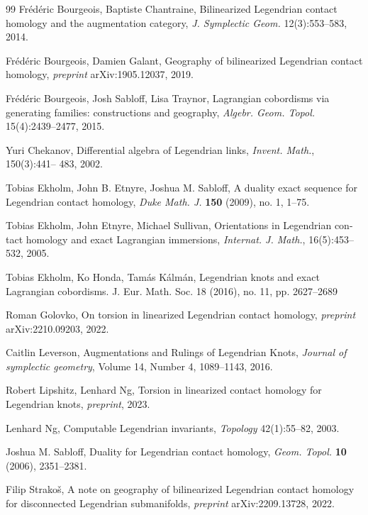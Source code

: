 \documentclass[11pt]{amsart}
\theoremstyle{plain}
\theoremstyle{remark}
\numberwithin{equation}{section}
\begin{document}
\begin{thebibliography}{99}
 Fr\'ed\'eric Bourgeois, Baptiste Chantraine, Bilinearized Legendrian contact homology and the augmentation category, 
{\em J. Symplectic Geom.} 12(3):553--583, 2014.

 Fr\'ed\'eric Bourgeois, Damien Galant, Geography of bilinearized Legendrian contact homology,
{\em preprint} arXiv:1905.12037, 2019.

 Fr\'ed\'eric Bourgeois, Josh Sabloff, Lisa Traynor, Lagrangian cobordisms via generating families: 
constructions and geography, {\em Algebr. Geom. Topol.} 15(4):2439--2477, 2015.

 Yuri Chekanov, Differential algebra of Legendrian links, {\em Invent. Math.}, 150(3):441–
483, 2002.

 Tobias Ekholm, John B. Etnyre, Joshua M. Sabloff, A duality exact sequence for Legendrian contact homology, {\em Duke Math. J.} {\bf 150} 
(2009), no. 1, 1--75.

Tobias Ekholm, John Etnyre, Michael Sullivan, Orientations in Legendrian con-
tact homology and exact Lagrangian immersions, {\em Internat. J. Math.}, 16(5):453–532,
2005.

Tobias Ekholm, Ko Honda, Tamás Kálmán, Legendrian knots and exact Lagrangian cobordisms. J. Eur. Math. Soc. 18 (2016), no. 11, pp. 2627–2689

 Roman Golovko, On torsion in linearized Legendrian contact homology, {\em preprint} arXiv:2210.09203, 2022.

 Caitlin Leverson, Augmentations and Rulings of Legendrian Knots, {\em Journal of symplectic geometry}, Volume 14, Number 4, 1089--1143, 2016.

 Robert Lipshitz, Lenhard Ng, Torsion in linearized contact homology for Legendrian knots, {\em preprint}, 2023. 

 Lenhard Ng, Computable Legendrian invariants, {\em Topology} 42(1):55--82, 2003.

 Joshua M. Sabloff, Duality for Legendrian contact homology, {\em Geom. Topol.} {\bf 10} (2006), 2351--2381.

 Filip Strako\v{s}, A note on geography of bilinearized Legendrian contact homology for disconnected Legendrian submanifolds, 
{\em preprint} arXiv:2209.13728, 2022.

\end{thebibliography}

 
\end{document}
